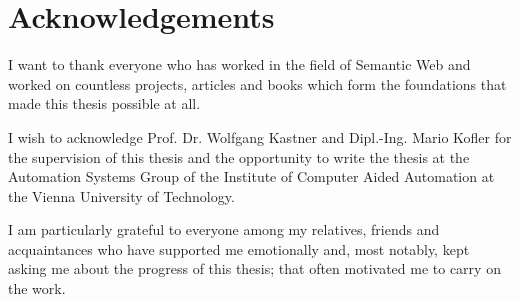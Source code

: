 \chapter*{Acknowledgements}

I want to thank everyone who has worked in the field of Semantic Web and worked on countless projects, articles and books which form the foundations that made this thesis possible at all.

I wish to acknowledge Prof. Dr. Wolfgang Kastner and Dipl.-Ing. Mario Kofler for the supervision of this thesis and the opportunity to write the thesis at the Automation Systems Group of the Institute of Computer Aided Automation at the Vienna University of Technology.

I am particularly grateful to everyone among my relatives, friends and acquaintances who have supported me emotionally and, most notably, kept asking me about the progress of this thesis; that often motivated me to carry on the work.